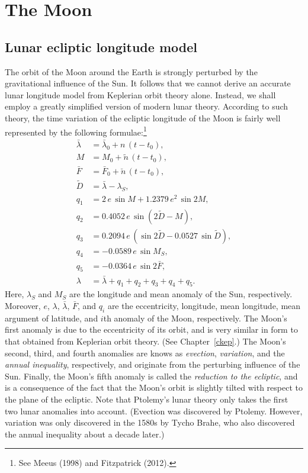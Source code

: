 \chapter{The Moon}\label{cmoon}

\section{Lunar ecliptic longitude model}
The orbit of the Moon around the Earth is strongly perturbed by the 
gravitational influence of the Sun. It follows that we cannot derive an accurate lunar longitude model
from Keplerian orbit theory alone. Instead, we shall employ a
greatly simplified version of modern lunar theory. According to such
theory, the time variation of the ecliptic longitude of the Moon is fairly
well represented by the following
formulae:\footnote {See  Meeus (1998) and Fitzpatrick (2012). }
\begin{align}
\bar{\lambda} &=\bar{\lambda}_0  + n\,(t-t_0),\\[0.5ex]
M &= M_0 + \tilde{n}\,(t-t_0),\\[0.5ex]
\bar{F} &= \bar{F}_0 + \breve {n}\,(t-t_0),\\[0.5ex]
\tilde{D} &= \bar{\lambda} - \lambda_S,\\[0.5ex]
q_1 &= 2\,e\,\sin M + 1.2379\,e^2\,\sin 2M,\\[0.5ex]
q_2 &= 0.4052\,e\,\sin (2\tilde{D} - M),\\[0.5ex]
q_3 &= 0.2094\,e\,(\sin 2\tilde{D} - 0.0527\,\sin \tilde{D}),\\[0.5ex]
q_4 &= -0.0589\,e\,\sin M_S,\\[0.5ex]
q_5&= -0.0364\,e\,\sin 2 \bar{F},\\[0.5ex]
\lambda &= \bar{\lambda} + q_1+q_2+q_3+q_4+q_5.
\end{align}
Here, $\lambda_S$ and $M_S$ are the longitude and mean anomaly
of the Sun, respectively. Moreover, $e$, $\lambda$, $\bar{\lambda}$, $\bar{F}$,
and $q_i$ are the eccentricity, longitude, mean longitude, mean argument of latitude,
and $i$th anomaly of the Moon, respectively. The Moon's first anomaly
is due to the eccentricity of its orbit, and is very similar in form to that obtained from Keplerian orbit theory. (See Chapter~\ref{ckep}.) The
Moon's second, third, and fourth anomalies are knows as
{\em evection}, {\em variation}, and the {\em annual inequality}, respectively, and originate from
the perturbing influence of the Sun. Finally, the Moon's fifth anomaly is
called the {\em reduction to the ecliptic}, and is a consequence of the fact that the Moon's
orbit is slightly tilted with respect to the plane of the ecliptic.
Note that Ptolemy's lunar theory only takes the first two
lunar anomalies into account. (Evection was discovered by Ptolemy. However, variation was only discovered in the 1580s by Tycho Brahe, who also discovered the annual inequality about a decade later.)

